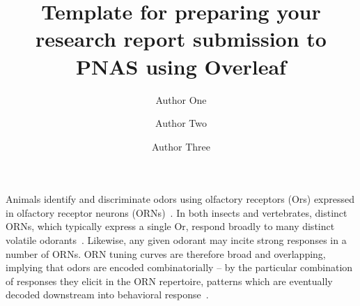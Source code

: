 \documentclass[9pt,twocolumn,twoside,lineno]{pnas-new}
\title{Template for preparing your research report submission to PNAS using Overleaf}
\author[a,c,1]{Author One}
\author[b,1,2]{Author Two}
\author[a]{Author Three}
\affil[a]{Affiliation One}
\affil[b]{Affiliation Two}
\affil[c]{Affiliation Three}
\begin{document}
%
%


Animals identify and discriminate odors using olfactory receptors (Ors) expressed in olfactory receptor neurons (ORNs)~\cite{Or_ORNs_maps, buck1991novel}. In both insects and vertebrates, distinct ORNs, which typically express a single Or, respond broadly to many distinct volatile odorants~\cite{malnic1999combinatorial, mosquito_combinatorial_coding, hildebrand1997mechanisms, hallem_carlson, debryune_odor_coding, friedrich1997combinatorial}. Likewise, any given odorant may incite strong responses in a number of ORNs. ORN tuning curves are therefore broad and overlapping, implying that odors are encoded combinatorially -- by the particular combination of responses they elicit in the ORN repertoire, patterns which are eventually decoded downstream into behavioral response~\cite{early_olfactory_processing}.


\end{document}
